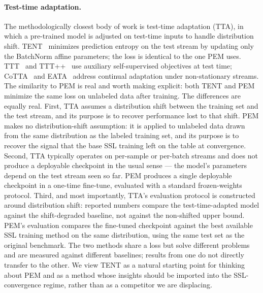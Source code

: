 \paragraph{Test-time adaptation.}
The methodologically closest body of work is test-time adaptation (TTA), in which a pre-trained model is adjusted on test-time inputs to handle distribution shift. TENT~\cite{wang2021tent} minimizes prediction entropy on the test stream by updating only the BatchNorm affine parameters; the loss is identical to the one PEM uses. TTT~\cite{sun2020ttt} and TTT++~\cite{liu2021tttplusplus} use auxiliary self-supervised objectives at test time; CoTTA~\cite{wang2022cotta} and EATA~\cite{niu2022eata} address continual adaptation under non-stationary streams. The similarity to PEM is real and worth making explicit: both TENT and PEM minimize the same loss on unlabeled data after training. The differences are equally real. First, TTA assumes a distribution shift between the training set and the test stream, and its purpose is to recover performance lost to that shift. PEM makes no distribution-shift assumption: it is applied to unlabeled data drawn from the same distribution as the labeled training set, and its purpose is to recover the signal that the base SSL training left on the table at convergence. Second, TTA typically operates on per-sample or per-batch streams and does not produce a deployable checkpoint in the usual sense --- the model's parameters depend on the test stream seen so far. PEM produces a single deployable checkpoint in a one-time fine-tune, evaluated with a standard frozen-weights protocol. Third, and most importantly, TTA's evaluation protocol is constructed around distribution shift: reported numbers compare the test-time-adapted model against the shift-degraded baseline, not against the non-shifted upper bound. PEM's evaluation compares the fine-tuned checkpoint against the best available SSL training method on the same distribution, using the same test set as the original benchmark. The two methods share a loss but solve different problems and are measured against different baselines; results from one do not directly transfer to the other. We view TENT as a natural starting point for thinking about PEM and as a method whose insights should be imported into the SSL-convergence regime, rather than as a competitor we are displacing.


